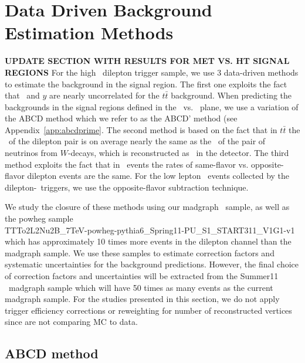 \section{Data Driven Background Estimation Methods}
\label{sec:datadriven}

{\bf UPDATE SECTION WITH RESULTS FOR MET VS. HT SIGNAL REGIONS}
For the high \pt\ dilepton trigger sample, we use 3 data-driven methods to 
estimate the background in the signal region. The first one exploits the fact that 
\Ht\ and $y$ are nearly uncorrelated for the $t\bar{t}$ background.
When predicting the backgrounds in the signal regions defined in the \met\ vs. \Ht\ plane,
we use a variation of the ABCD method which we refer to as the ABCD' method
(see Appendix~\ref{app:abcdprime}.
The second method
is based on the fact that in $t\bar{t}$ the \pt\ of the dilepton pair is on average 
nearly the same as the \pt\ of the pair of neutrinos
from $W$-decays, which is reconstructed as \met\ in the
detector. The third method exploits the fact that in \ttbar\ events
the rates of same-flavor vs. opposite-flavor dilepton events are
the same. For the low lepton \pt\ events collected by the dilepton-\Ht\ triggers,
we use the opposite-flavor subtraction technique.

We study the closure of these methods using our madgraph \ttbar\ sample, as well as 
the powheg sample \\
TTTo2L2Nu2B\_7TeV-powheg-pythia6\_Spring11-PU\_S1\_START311\_V1G1-v1
which has approximately 10 times more events in the dilepton channel than the madgraph sample.
We use these samples to estimate correction factors and systematic uncertainties for the background predictions. 
However, the final choice of correction factors and uncertainties will be extracted from the Summer11 \ttbar\ madgraph
sample which will have 50 times as many events as the current madgraph sample. 
For the studies presented in this section, we do not apply trigger efficiency corrections or reweighting for
number of reconstructed vertices since are not comparing MC to data. 

\subsection{ABCD method}
\label{sec:abcd}


